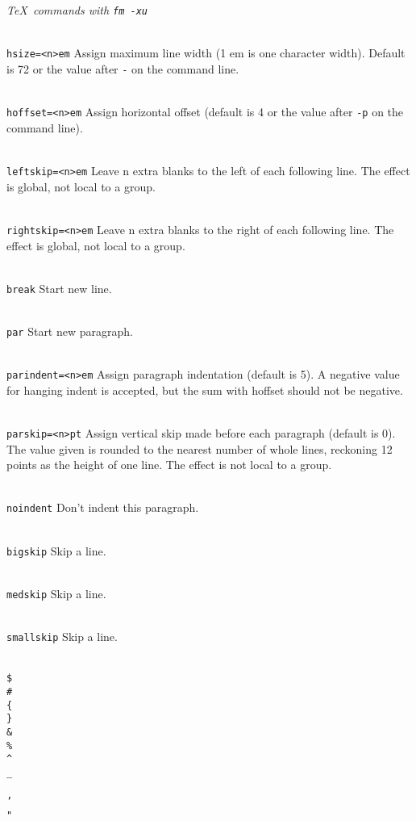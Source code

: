 \bigskip
\centerline{\it \TeX ~commands with \tt fm~-xu}
\medskip

\item{\tt \\hsize=<n>em}
			Assign maximum line width (1 em is
			one character width).  Default is 72 or the
			value after {\tt -} on the command line.
\item{\tt \\hoffset=<n>em}
			Assign horizontal offset (default is 4 or
			the value after {\tt -p} on the command line).
\item{\tt \\leftskip=<n>em}
			Leave n extra blanks to the left of each
			following line.  The effect is global, not local to
			a group.
\item{\tt \\rightskip=<n>em}
			Leave n extra blanks to the right of each
			following line.  The effect is global, not local to
			a group.
\item{\tt \\break}	Start new line.
\item{\tt \\par}	Start new paragraph.
\item{\tt \\parindent=<n>em}
			Assign paragraph indentation (default is
			5).  A negative value for hanging indent
			is accepted, but the sum with hoffset should
			not be negative.
\item{\tt \\parskip=<n>pt}
			Assign vertical skip made before each
			paragraph (default is 0).  The value given
			is rounded to the nearest number of whole
			lines, reckoning 12 points as the height of
			one line.  The effect is not local to a group.
\item{\tt \\noindent}	Don't indent this paragraph.
\item{\tt \\bigskip}	Skip a line.
\item{\tt \\medskip}	Skip a line.
\item{\tt \\smallskip}	Skip a line.
\item{\tt \\\$ \\\# \\\{ \\\} \\\& \\\% \\^ \\_ \\\~ \\' \\" \\\\}
